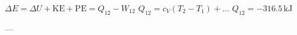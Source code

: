 \( \Delta E = \Delta U + \text{KE} + \text{PE} = Q_{12} - W_{12} \)  
\( Q_{12} = c_V (T_2 - T_1) + \dots \)  
\( Q_{12} = -316.5 \, \text{kJ} \)  

---